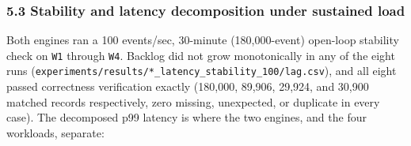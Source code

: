\documentclass[
]{article}
\begin{document}
\hypertarget{stability-and-latency-decomposition-under-sustained-load}{%
\subsubsection{5.3 Stability and latency decomposition under sustained
load}\label{stability-and-latency-decomposition-under-sustained-load}}

Both engines ran a 100 events/sec, 30-minute (180,000-event) open-loop
stability check on \texttt{W1} through \texttt{W4}. Backlog did not grow
monotonically in any of the eight runs
(\texttt{experiments/results/*\_latency\_stability\_100/lag.csv}), and
all eight passed correctness verification exactly (180,000, 89,906,
29,924, and 30,900 matched records respectively, zero missing,
unexpected, or duplicate in every case). The decomposed p99 latency is
where the two engines, and the four workloads, separate:
\end{document}
